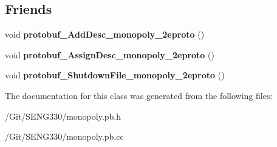 \subsection*{Friends}
\begin{DoxyCompactItemize}
\item 
\hypertarget{classmonopoly_1_1_all_buyable_grids_a946ee1d082b81a7d0361879406b700b7}{}void {\bfseries protobuf\+\_\+\+Add\+Desc\+\_\+monopoly\+\_\+2eproto} ()\label{classmonopoly_1_1_all_buyable_grids_a946ee1d082b81a7d0361879406b700b7}

\item 
\hypertarget{classmonopoly_1_1_all_buyable_grids_afdd09e65c445afc8bffa7a2679963dfb}{}void {\bfseries protobuf\+\_\+\+Assign\+Desc\+\_\+monopoly\+\_\+2eproto} ()\label{classmonopoly_1_1_all_buyable_grids_afdd09e65c445afc8bffa7a2679963dfb}

\item 
\hypertarget{classmonopoly_1_1_all_buyable_grids_a5eef3ccc53de8b4f594086f8d47b2ee8}{}void {\bfseries protobuf\+\_\+\+Shutdown\+File\+\_\+monopoly\+\_\+2eproto} ()\label{classmonopoly_1_1_all_buyable_grids_a5eef3ccc53de8b4f594086f8d47b2ee8}

\end{DoxyCompactItemize}


The documentation for this class was generated from the following files\+:\begin{DoxyCompactItemize}
\item 
/\+Git/\+S\+E\+N\+G330/monopoly.\+pb.\+h\item 
/\+Git/\+S\+E\+N\+G330/monopoly.\+pb.\+cc\end{DoxyCompactItemize}
